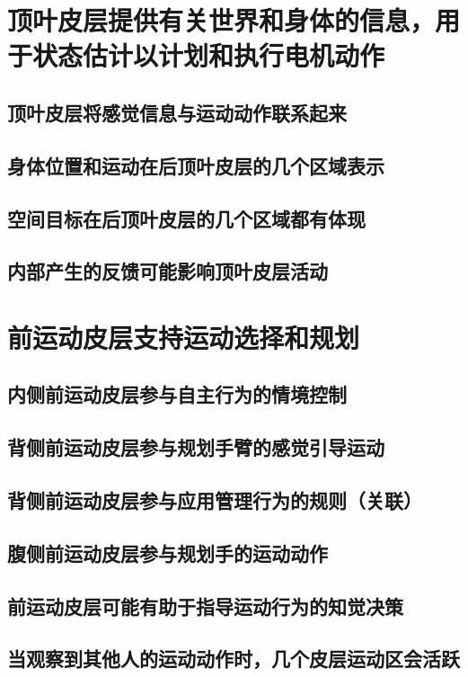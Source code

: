 \section{顶叶皮层提供有关世界和身体的信息，用于状态估计以计划和执行电机动作}
\subsection{顶叶皮层将感觉信息与运动动作联系起来}
\subsection{身体位置和运动在后顶叶皮层的几个区域表示}
\subsection{空间目标在后顶叶皮层的几个区域都有体现}
\subsection{内部产生的反馈可能影响顶叶皮层活动}

\section{前运动皮层支持运动选择和规划}
\subsection{内侧前运动皮层参与自主行为的情境控制}
\subsection{背侧前运动皮层参与规划手臂的感觉引导运动}
\subsection{背侧前运动皮层参与应用管理行为的规则（关联）}
\subsection{腹侧前运动皮层参与规划手的运动动作}
\subsection{前运动皮层可能有助于指导运动行为的知觉决策}
\subsection{当观察到其他人的运动动作时，几个皮层运动区会活跃}
